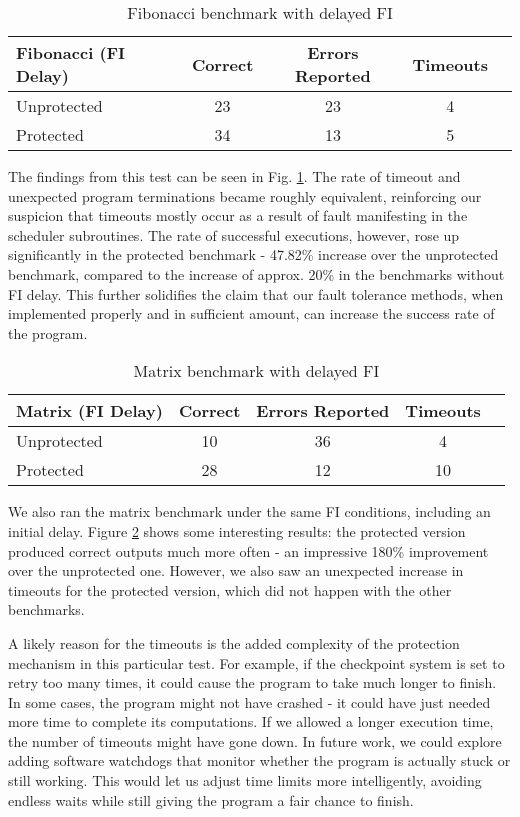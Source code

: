 \begin{table}[h]
\centering
\begin{tabular}{|l|c|c|c|c|}
\hline
\textbf{Fibonacci (FI Delay)} & \textbf{Correct} & \textbf{Errors Reported} & \textbf{Timeouts} \\
\hline
Unprotected & 23 & 23 & 4 \\
Protected & 34 & 13 & 5 \\
\hline
\end{tabular}
\caption{Fibonacci benchmark with delayed FI}
\label{tab:fib50_delayed}
\end{table}

The findings from this test can be seen in Fig. \ref{tab:fib50_delayed}. The rate of timeout and unexpected program terminations became roughly equivalent, reinforcing our suspicion that timeouts mostly occur as a result of fault manifesting in the scheduler subroutines. The rate of successful executions, however, rose up significantly in the protected benchmark - 47.82\% increase over the unprotected benchmark, compared to the increase of approx. 20\% in the benchmarks without FI delay. 
This further solidifies the claim that our fault tolerance methods, when implemented properly and in sufficient amount, can increase the success rate of the program.

\begin{table}[h]
\centering
\begin{tabular}{|l|c|c|c|c|}
\hline
\textbf{Matrix (FI Delay)} & \textbf{Correct} & \textbf{Errors Reported} & \textbf{Timeouts} \\
\hline
Unprotected & 10 & 36 & 4 \\
Protected & 28 & 12 & 10 \\
\hline
\end{tabular}
\caption{Matrix benchmark with delayed FI}
\label{tab:matrix50_delayed}
\end{table}

We also ran the matrix benchmark under the same FI conditions, including an initial delay. Figure \ref{tab:matrix50_delayed} shows some interesting results: the protected version produced correct outputs much more often - an impressive 180\% improvement over the unprotected one. However, we also saw an unexpected increase in timeouts for the protected version, which did not happen with the other benchmarks.

A likely reason for the timeouts is the added complexity of the protection mechanism in this particular test. For example, if the checkpoint system is set to retry too many times, it could cause the program to take much longer to finish. In some cases, the program might not have crashed - it could have just needed more time to complete its computations. If we allowed a longer execution time, the number of timeouts might have gone down. In future work, we could explore adding software watchdogs that monitor whether the program is actually stuck or still working. This would let us adjust time limits more intelligently, avoiding endless waits while still giving the program a fair chance to finish.


